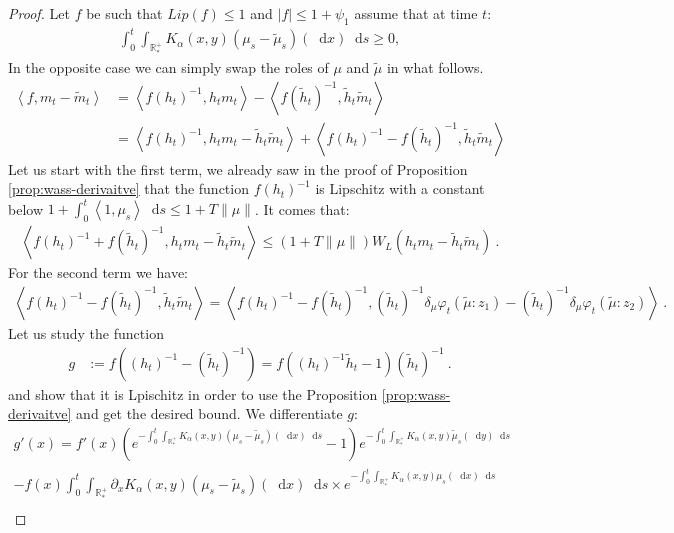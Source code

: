 \documentclass[11pt,a4paper]{article}
\newcommand{\RRP}{\mathbb{R}^+_*}
\newcommand{\brac}[1]{\left\langle#1\right\rangle}
\newcommand{\dd}{\mathop{}\!\mathrm{d}}
\begin{document}
\begin{proof}
    Let $f$ be such that $Lip(f) \leq 1$ and $|f| \leq 1 + \psi_1$ assume that at time $t$:
    \begin{align}\label{proof:eq:wass-huge-assumption1}
        \int_0^t \int_{\RRP} K_\alpha(x,y) (\mu_s-\tilde{\mu}_s)(\dd x)\dd s \geq 0,
    \end{align}
    In the opposite case we can simply swap the roles of $\mu$ and $\tilde{\mu}$ in what follows.
    \begin{align*}
        \brac{f,m_t-\tilde{m}_t} 
        &= \brac{f(h_t)^{-1}, h_t m_t} - \brac{f(\tilde{h}_t)^{-1},\tilde{h}_t\tilde{m}_t}\\
        &= \brac{f(h_t)^{-1} ,h_tm_t - \tilde{h}_t\tilde{m}_t} + \brac{f(h_t)^{-1} - f(\tilde{h}_t)^{-1},\tilde{h}_t\tilde{m}_t}
    \end{align*}
    Let us start with the first term, we already saw in the proof of Proposition \ref{prop:wass-derivaitve} that the function $f(h_t)^{-1}$ is Lipschitz with a constant below $1 + \int_0^t \brac{1,\mu_s} \dd s \leq 1 + T\|\mu\|$. It comes that:
    \begin{align*}
        \brac{f(h_t)^{-1} + f(\tilde{h}_t)^{-1},h_tm_t - \tilde{h}_t\tilde{m}_t}
        \leq\left( 1 + T\|\mu\|\right)W_L(h_tm_t - \tilde{h}_t\tilde{m}_t)\ .
    \end{align*}
    For the second term we have:
    \begin{align*}
        \brac{f(h_t)^{-1} - f(\tilde{h}_t)^{-1},\tilde{h}_t\tilde{m}_t} = \brac{f(h_t)^{-1} - f(\tilde{h}_t)^{-1},(\tilde{h}_t)^{-1}\delta_\mu\varphi_t(\tilde{\mu}:z_1)- (\tilde{h}_t)^{-1}\delta_\mu\varphi_t(\tilde{\mu}:z_2)}\ .
    \end{align*}
    Let us study the function
    \begin{align*}
        g &:= f\left((h_t)^{-1} - (\tilde{h}_t)^{-1}\right) = f\left((h_t)^{-1}\tilde{h}_t - 1 \right)(\tilde{h}_t)^{-1}\ .
    \end{align*}
    and show that it is Lpischitz in order to use the Proposition \ref{prop:wass-derivaitve} and get the desired bound. We differentiate $g$:
    \begin{multline*}
        g'(x) = f'(x) \left(e^{-\int_0^t \int_{\RRP} K_\alpha(x,y) (\mu_s-\tilde{\mu}_s)(\dd x)\dd s} - 1\right) e^{-\int_0^t \int_{\RRP} K_\alpha(x,y)\tilde{\mu}_s(\dd y) \dd s}\\
            - f(x) \int_0^t \int_{\RRP} \partial_x K_\alpha(x,y) (\mu_s-\tilde{\mu}_s)(\dd x)\dd s\times  e^{-\int_0^t \int_{\RRP} K_\alpha(x,y) \mu_s(\dd x)\dd s} \\

\end{multline*}
\end{proof}
\end{document}
